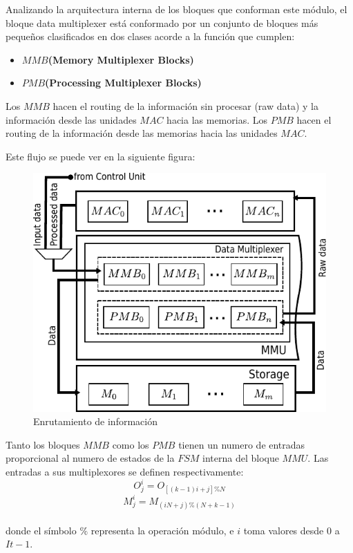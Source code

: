 \documentclass[a4paper]{article}
\begin{document}
\bigskip
Analizando la arquitectura interna de los bloques que conforman este módulo, el bloque data multiplexer está conformado por un conjunto de bloques más pequeños clasificados en dos clases acorde a la función que cumplen:
\begin{frame}{}
\begin{itemize}

 \item \textbf{$MMB$(Memory Multiplexer Blocks)}
  \item \textbf{$PMB$(Processing Multiplexer Blocks)}

\end{itemize}
\end{frame}


Los $MMB$ hacen el routing de la información sin procesar (raw data) y la información desde las unidades $MAC$ hacia las memorias.
Los $PMB$ hacen el routing de la información desde las memorias hacia las unidades $MAC$.\\
\bigskip

Este flujo se puede ver en la siguiente figura:
\begin{figure}[H]
\centering
\includegraphics[scale=0.9]{muxes}
\caption{ Enrutamiento de información}
\label{mmu_routing}
\end{figure}
Tanto los bloques $MMB$ como los $PMB$ tienen un numero de entradas proporcional al numero de estados de la $FSM$ interna del bloque $MMU$. 
Las entradas a sus multiplexores se definen respectivamente:
\begin{equation}%
  O_j^i = O_{[(k-1)i+j]\%N}
\end{equation}
\begin{equation}%
  M_j^i = M_{(iN+j)\%(N+k-1)}
\end{equation}
\\
donde el símbolo $ \% $ representa la operación módulo, e $i$ toma valores desde $0$ a $It-1$.
\end{document}
